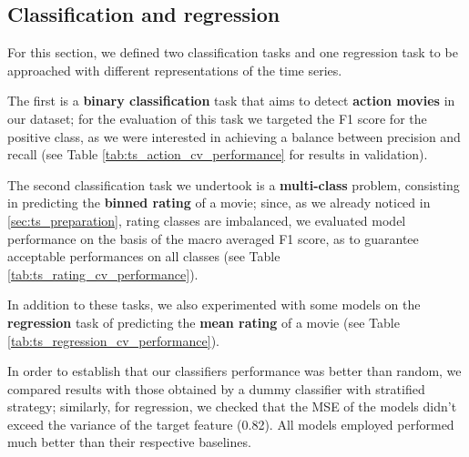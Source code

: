 \subsection{Classification and regression}
For this section, we defined two classification tasks and one regression task to be approached with different representations of the time series.

The first is a \textbf{binary classification} task that aims to detect \textbf{action movies} in our dataset; for the evaluation of this task we targeted the F1 score for the positive class, as we were interested in achieving a balance between precision and recall (see Table \ref{tab:ts_action_cv_performance} for results in validation).

The second classification task we undertook is a \textbf{multi-class} problem, consisting in predicting the \textbf{binned rating} of a movie; since, as we already noticed in \ref{sec:ts_preparation}, rating classes are imbalanced, we evaluated model performance on the basis of the macro averaged F1 score, as to guarantee acceptable performances on all classes (see Table \ref{tab:ts_rating_cv_performance}).

In addition to these tasks, we also experimented with some models on the \textbf{regression} task of predicting the \textbf{mean rating} of a movie (see Table \ref{tab:ts_regression_cv_performance}).

In order to establish that our classifiers performance was better than random, we compared results with those obtained by a dummy classifier with stratified strategy; similarly, for regression, we checked that the MSE of the models didn't exceed the variance of the target feature (0.82).
All models employed performed much better than their respective baselines.

\begin{table}
    \centering
    \caption{Performance of tested models for the action classification task in validation (mean and standard deviation).}
    \label{tab:ts_action_cv_performance}
\end{table}

\begin{table}
    \centering
    \caption{Performance of tested models for the rating classification task in validation (macro averages).}\label{tab:ts_rating_cv_performance}
\end{table}

